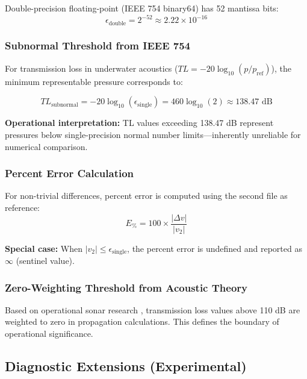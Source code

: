 \documentclass[11pt,letterpaper]{article}
\begin{document}
Double-precision floating-point (IEEE 754 binary64) has 52 mantissa bits:
\begin{equation}
    \epsilon_{\text{double}} = 2^{-52} \approx 2.22 \times 10^{-16}
\end{equation}

\subsubsection{Subnormal Threshold from IEEE 754}

For transmission loss in underwater acoustics ($TL = -20\log_{10}(p/p_{\text{ref}})$), the minimum representable pressure corresponds to:

\begin{equation}
    TL_{\text{subnormal}} = -20\log_{10}(\epsilon_{\text{single}}) = 460\log_{10}(2) \approx 138.47 \text{ dB}
\end{equation}

\textbf{Operational interpretation:} TL values exceeding 138.47 dB represent pressures below single-precision normal number limits—inherently unreliable for numerical comparison.

\subsubsection{Percent Error Calculation}

For non-trivial differences, percent error is computed using the second file as reference:
\begin{equation}
    E_{\%} = 100 \times \frac{|\Delta v|}{|v_2|}
\end{equation}

\textbf{Special case:} When $|v_2| \leq \epsilon_{\text{single}}$, the percent error is undefined and reported as $\infty$ (sentinel value).

\subsubsection{Zero-Weighting Threshold from Acoustic Theory}

Based on operational sonar research \cite{doi:10.23919/OCEANS.2009.5422312}, transmission loss values above 110 dB are weighted to zero in propagation calculations. This defines the boundary of operational significance.

\subsection{Diagnostic Extensions (Experimental)}
\end{document}
